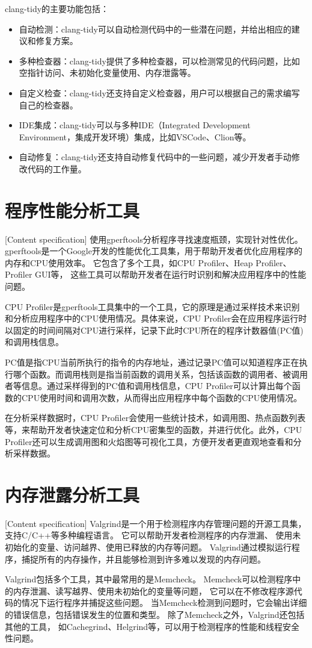 clang-tidy的主要功能包括：
\begin{itemize}[itemindent=2em]

\item 自动检测：clang-tidy可以自动检测代码中的一些潜在问题，并给出相应的建议和修复方案。

\item 多种检查器：clang-tidy提供了多种检查器，可以检测常见的代码问题，比如空指针访问、未初始化变量使用、内存泄露等。

\item 自定义检查：clang-tidy还支持自定义检查器，用户可以根据自己的需求编写自己的检查器。

\item IDE集成：clang-tidy可以与多种IDE（Integrated Development Environment，集成开发环境）集成，比如VSCode、Clion等。

\item 自动修复：clang-tidy还支持自动修复代码中的一些问题，减少开发者手动修改代码的工作量。
\end{itemize}


\section{程序性能分析工具}[Content specification]
使用gperftools分析程序寻找速度瓶颈，实现针对性优化。
gperftools是一个Google开发的性能优化工具集，用于帮助开发者优化应用程序的内存和CPU使用效率。
它包含了多个工具，如CPU Profiler、Heap Profiler、Profiler GUI等，
这些工具可以帮助开发者在运行时识别和解决应用程序中的性能问题。

CPU Profiler是gperftools工具集中的一个工具，它的原理是通过采样技术来识别和分析应用程序中的CPU使用情况。具体来说，CPU Profiler会在应用程序运行时以固定的时间间隔对CPU进行采样，记录下此时CPU所在的程序计数器值(PC值)和调用栈信息。

PC值是指CPU当前所执行的指令的内存地址，通过记录PC值可以知道程序正在执行哪个函数。而调用栈则是指当前函数的调用关系，包括该函数的调用者、被调用者等信息。通过采样得到的PC值和调用栈信息，CPU Profiler可以计算出每个函数的CPU使用时间和调用次数，从而得出应用程序中每个函数的CPU使用情况。

在分析采样数据时，CPU Profiler会使用一些统计技术，如调用图、热点函数列表等，来帮助开发者快速定位和分析CPU密集型的函数，并进行优化。此外，CPU Profiler还可以生成调用图和火焰图等可视化工具，方便开发者更直观地查看和分析采样数据。
\section{内存泄露分析工具}[Content specification]
Valgrind是一个用于检测程序内存管理问题的开源工具集，支持C/C++等多种编程语言。
它可以帮助开发者检测程序的内存泄漏、
使用未初始化的变量、访问越界、使用已释放的内存等问题。
Valgrind通过模拟运行程序，捕捉所有的内存操作，并且能够检测到许多难以发现的内存问题。

Valgrind包括多个工具，其中最常用的是Memcheck。
Memcheck可以检测程序中的内存泄漏、读写越界、使用未初始化的变量等问题，
它可以在不修改程序源代码的情况下运行程序并捕捉这些问题。
当Memcheck检测到问题时，它会输出详细的错误信息，包括错误发生的位置和类型。
除了Memcheck之外，Valgrind还包括其他的工具，
如Cachegrind、Helgrind等，可以用于检测程序的性能和线程安全性问题。

